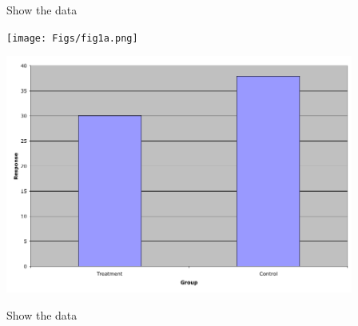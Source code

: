 \documentclass[12pt]{article}
\newcommand{\headsize}{\fontsize{35}{35} \selectfont}
\begin{document}
\newpage

\addtocounter{page}{-1}

\headsize \color{yellow}
\hfill \begin{minipage}{5.75in}
\centering
Show the data
\end{minipage}

\vspace{30mm}

\begin{minipage}[t]{4.5in}
\vspace*{0cm}

\texttt{[image: Figs/fig1a.png]}
\end{minipage}
\hfill
\begin{minipage}[t]{4.5in}
\vspace*{0cm}

\includegraphics[width=4.5in]{Figs/fig1d.png}
\end{minipage}



\newpage

\addtocounter{page}{-1}

\headsize \color{yellow}
\hfill \begin{minipage}{5.75in}
\centering
Show the data
\end{minipage}

\vspace{30mm}
\end{document}
